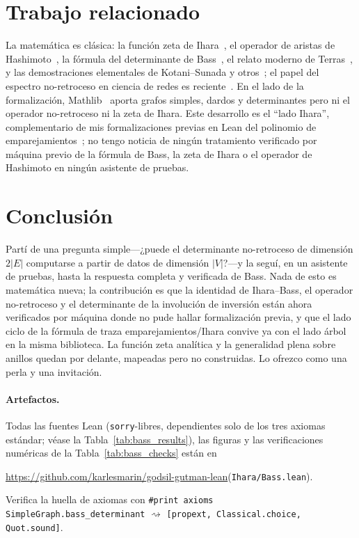\documentclass[11pt]{article}
\newcommand{\lean}[1]{\texttt{#1}}
\begin{document}
\section{Trabajo relacionado}
\label{sec:related}

La matem\'atica es cl\'asica: la funci\'on zeta de Ihara~\cite{Ihara1966}, el operador de aristas de
Hashimoto~\cite{Hashimoto1989}, la f\'ormula del determinante de Bass~\cite{Bass1992}, el relato
moderno de Terras~\cite{Terras2011}, y las demostraciones elementales de Kotani--Sunada y
otros~\cite{KotaniSunada2000}; el papel del espectro no-retroceso en ciencia de redes es
reciente~\cite{KarrerNewmanZdeborova2014}. En el lado de la formalizaci\'on, Mathlib~\cite{Mathlib2020}
aporta grafos simples, dardos y determinantes pero ni el operador no-retroceso ni la zeta de Ihara.
Este desarrollo es el ``lado Ihara'', complementario de mis formalizaciones previas en Lean del polinomio
de emparejamientos~\cite{PartI,PartII}; no tengo noticia de ning\'un tratamiento verificado por
m\'aquina previo de la f\'ormula de Bass, la zeta de Ihara o el operador de Hashimoto en ning\'un
asistente de pruebas.

\section{Conclusi\'on}

Part\'i de una pregunta simple---¿puede el determinante no-retroceso de dimensi\'on $2|E|$ computarse
a partir de datos de dimensi\'on $|V|$?---y la segu\'i, en un asistente de pruebas, hasta la respuesta
completa y verificada de Bass. Nada de esto es matem\'atica nueva; la contribuci\'on es que la
identidad de Ihara--Bass, el operador no-retroceso y el determinante de la involuci\'on de inversi\'on
est\'an ahora verificados por m\'aquina donde no pude hallar formalizaci\'on previa, y que el lado
ciclo de la f\'ormula de traza emparejamientos/Ihara convive ya con el lado \'arbol en la misma
biblioteca. La funci\'on zeta anal\'itica y la generalidad plena sobre anillos quedan por delante,
mapeadas pero no construidas. Lo ofrezco como una perla y una invitaci\'on.

\paragraph{Artefactos.} Todas las fuentes Lean (\lean{sorry}-libres, dependientes solo de los tres
axiomas est\'andar; v\'ease la Tabla~\ref{tab:bass_results}), las figuras y las verificaciones
num\'ericas de la Tabla~\ref{tab:bass_checks} est\'an en
\begin{center}
\url{https://github.com/karlesmarin/godsil-gutman-lean}\quad(\lean{Ihara/Bass.lean}).
\end{center}
Verifica la huella de axiomas con \lean{\#print axioms SimpleGraph.bass\_determinant}
$\rightsquigarrow$ \lean{[propext, Classical.choice, Quot.sound]}.



\end{document}
